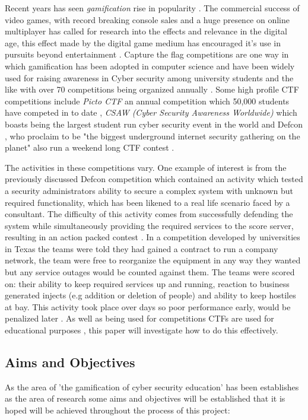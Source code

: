 \documentclass[12pt,a4paper]{article}
\begin{document}
Recent years has seen \emph{gamification} rise in popularity \cite{deterding2011game}. The commercial success of video games, with record breaking console sales and a huge presence on online multiplayer has called for research into the effects and relevance in the digital age, this effect made by the digital game medium has encouraged it's use in pursuits beyond entertainment \cite{seaborn2015gamification}. Capture the flag competitions are one way in which gamification has been adopted in computer science and have been widely used for raising awareness in Cyber security among university students and the like \cite{ford2017capture} with over 70 competitions being organized annually \cite{katsantonis2017conceptual1}. Some high profile CTF competitions include \emph{Picto CTF} \cite{pictoctf} an annual competition which 50,000 students have competed in to date \cite{pictoctfstat}, \emph{CSAW (Cyber Security Awareness Worldwide)} which boasts being the largest student run cyber security event in the world \cite{csaw} and Defcon \cite{defcon}, who proclaim to be "the biggest underground internet security gathering on the planet" also run a weekend long CTF contest \cite{cowan2003defcon}.  


The activities in these competitions vary. One example of interest is from the previously discussed Defcon competition which contained an activity which tested a security administrators ability to secure a complex system with unknown but required functionality, which has been likened to a real life scenario faced by a consultant. The difficulty of this activity comes from successfully defending the system while simultaneously providing the required services to the score server, resulting in an action packed contest \cite{cowan2003defcon}. In a competition developed by universities in Texas the teams were told they had gained a contract to run a company network, the team were free to reorganize the equipment in any way they wanted but any service outages would be counted against them. The teams were scored on: their ability to keep  required services up and running, reaction to business generated injects (e.g addition or deletion of people) and ability to keep hostiles at bay. This activity took place over days so poor performance early, would be penalized later \cite{conklin2006cyber}. As well as being used for competitions CTFs are used for educational purposes \cite{noor2018usability}, this paper will investigate how to do this effectively.
\subsection{Aims and Objectives} 
As the area of 'the gamification of cyber security education' has been establishes as the area of research some aims and objectives will be established that it is hoped will be achieved throughout the process of this project:  
\end{document}
